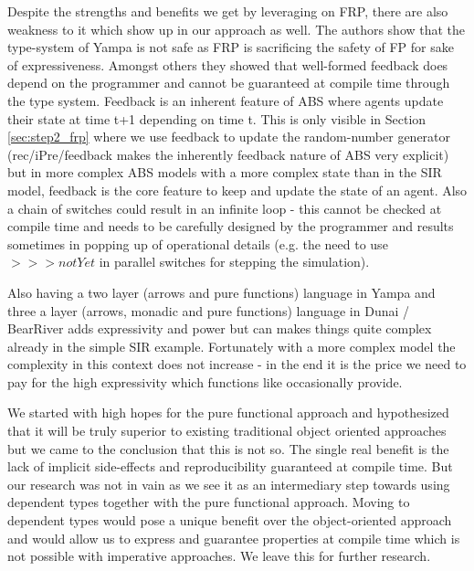 Despite the strengths and benefits we get by leveraging on FRP, there are also weakness to it which show up in our approach as well. The authors \cite{sculthorpe_safe_2009} show that the type-system of Yampa is not safe as FRP is sacrificing the safety of FP for sake of expressiveness. Amongst others they showed that well-formed feedback does depend on the programmer and cannot be guaranteed at compile time through the type system. Feedback is an inherent feature of ABS where agents update their state at time t+1 depending on time t. This is only visible in Section \ref{sec:step2_frp} where we use feedback to update the random-number generator (rec/iPre/feedback makes the inherently feedback nature of ABS very explicit) but in more complex ABS models with a more complex state than in the SIR model, feedback is the core feature to keep and update the state of an agent. Also a chain of switches could result in an infinite loop - this cannot be checked at compile time and needs to be carefully designed by the programmer and results sometimes in popping up of operational details (e.g. the need to use $>>> notYet$ in parallel switches for stepping the simulation). 

Also having a two layer (arrows and pure functions) language in Yampa \cite{jeffrey_causality_2013} and three a layer (arrows, monadic and pure functions) language in Dunai / BearRiver adds expressivity and power but can makes things quite complex already in the simple SIR example. Fortunately with a more complex model the complexity in this context does not increase - in the end it is the price we need to pay for the high expressivity which functions like occasionally provide.

We started with high hopes for the pure functional approach and hypothesized that it will be truly superior to existing traditional object oriented approaches but we came to the conclusion that this is not so. The single real benefit is the lack of implicit side-effects and reproducibility guaranteed at compile time. But our research was not in vain as we see it as an intermediary step towards using dependent types together with the pure functional approach. Moving to dependent types would pose a unique benefit over the object-oriented approach and would allow us to express and guarantee properties at compile time which is not possible with imperative approaches. We leave this for further research.

